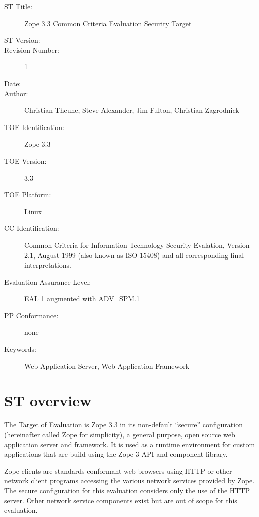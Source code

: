 \documentclass[12pt,english]{scrbook}
\begin{document}
\begin{description}

  \item[ST Title:] Zope 3.3 Common Criteria Evaluation Security Target

  \item[ST Version:] \svnInfoRevision

  \item[Revision Number:] 1

  \item[Date:] \svnInfoLongDate

  \item[Author:] Christian Theune, Steve Alexander, Jim Fulton, Christian Zagrodnick

  \item[TOE Identification:] Zope 3.3

  \item[TOE Version:] 3.3

  \item[TOE Platform:] Linux

  \item[CC Identification:] Common Criteria for Information Technology Security
  Evalation, Version 2.1, August 1999 (also known as ISO 15408) and all
  corresponding final interpretations.

  \item[Evaluation Assurance Level:] EAL 1 augmented with ADV\_SPM.1

  \item[PP Conformance:] none

  \item[Keywords:] Web Application Server, Web Application Framework
\end{description}


\section{ST overview}

The Target of Evaluation is Zope 3.3 in its non-default ``secure''
configuration (hereinafter called Zope for simplicity), a general purpose, open
source web application server and framework. It is used as a runtime
environment for custom applications that are build using the Zope 3 API and
component library.

Zope clients are standards conformant web browsers using HTTP or other network
client programs accessing the various network services provided by Zope. The
secure configuration for this evaluation considers only the use of the HTTP
server. Other network service components exist but are out of scope for this
evaluation.
\end{document}
